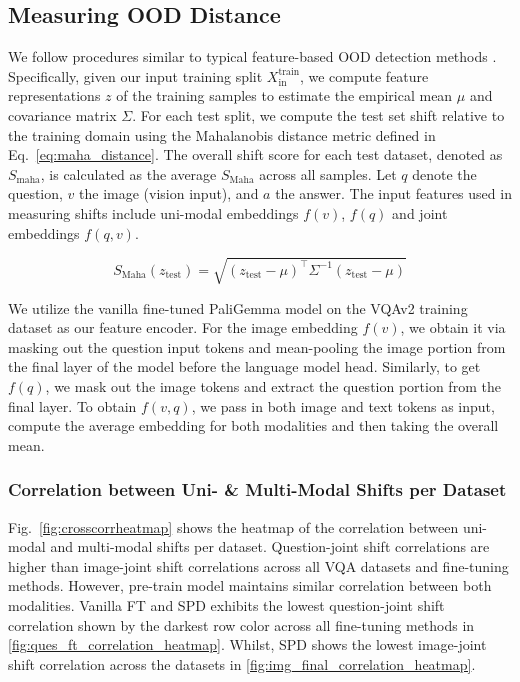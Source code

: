 \subsection{Measuring OOD Distance}
\label{sec:ood_dist}

We follow procedures similar to typical feature-based OOD detection methods \citep{Shi_2024_WACV}. Specifically, given our input training split \( X_{\text{in}}^{\text{train}} \), we compute feature representations \( z \) of the training samples to estimate the empirical mean \( \mu \) and covariance matrix \( \Sigma \). For each test split, we compute the test set shift relative to the training domain using the Mahalanobis distance metric defined in Eq.~\ref{eq:maha_distance}. The overall shift score for each test dataset, denoted as \( S_{\text{maha}} \), is calculated as the average 
\( S_{\text{Maha}} \) across all samples. Let \( q \) denote the question, \( v \) the image (vision input), and \( a \) the answer. The input features used in measuring shifts include uni-modal embeddings \( f(v) \), \( f(q) \) and joint embeddings \( f(q,v) \).

\begin{equation}
S_{\text{Maha}}(z_{\text{test}}) = \sqrt{(z_{\text{test}} - \mu)^\top \Sigma^{-1} (z_{\text{test}} - \mu)}
\label{eq:maha_distance}
\end{equation}

We utilize the vanilla fine-tuned PaliGemma model on the VQAv2 training dataset as our feature encoder. For the image embedding \( f(v) \), we obtain it via masking out the question input tokens and mean-pooling the image portion from the final layer of the model before the language model head. Similarly, to get \( f(q) \), we mask out the image tokens and extract the question portion from the final layer. To obtain \(f(v,q)\), we pass in both image and text tokens as input, compute the average embedding for both modalities and then taking the overall mean. 

\subsubsection{Correlation between Uni- \& Multi-Modal Shifts per Dataset}

Fig.~\ref{fig:crosscorrheatmap} shows the heatmap of the correlation between uni-modal and multi-modal shifts per dataset. Question-joint shift correlations are higher than image-joint shift correlations across all VQA datasets and fine-tuning methods. However, pre-train model maintains similar correlation between both modalities. Vanilla FT and SPD exhibits the lowest question-joint shift correlation shown by the darkest row color across all fine-tuning methods in \ref{fig:ques_ft_correlation_heatmap}. Whilst, SPD shows the lowest image-joint shift correlation across the datasets in \ref{fig:img_final_correlation_heatmap}.

